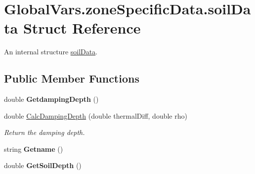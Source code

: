\hypertarget{struct_global_vars_1_1zone_specific_data_1_1soil_data}{}\section{Global\+Vars.\+zone\+Specific\+Data.\+soil\+Data Struct Reference}
\label{struct_global_vars_1_1zone_specific_data_1_1soil_data}


An internal structure \mbox{\hyperlink{struct_global_vars_1_1zone_specific_data_1_1soil_data}{soil\+Data}}.  


\subsection*{Public Member Functions}
\begin{DoxyCompactItemize}
\item 
\mbox{\label{struct_global_vars_1_1zone_specific_data_1_1soil_data_a3c6e5c9493ccc4e2097cf1c44fdf42b1}} 
double {\bfseries Getdamping\+Depth} ()
\item 
double \mbox{\hyperlink{struct_global_vars_1_1zone_specific_data_1_1soil_data_ac1e39d153db5d24b006172b9a44ee05a}{Calc\+Damping\+Depth}} (double thermal\+Diff, double rho)
\begin{DoxyCompactList}\small\item\em Return the damping depth. \end{DoxyCompactList}\item 
\mbox{\label{struct_global_vars_1_1zone_specific_data_1_1soil_data_a510ebb36fe6c8151c41361fb5b285d1e}} 
string {\bfseries Getname} ()
\item 
\mbox{\label{struct_global_vars_1_1zone_specific_data_1_1soil_data_a5f038b5960f38630b8edf6075f97154e}} 
double {\bfseries Get\+Soil\+Depth} ()
\end{DoxyCompactItemize}
